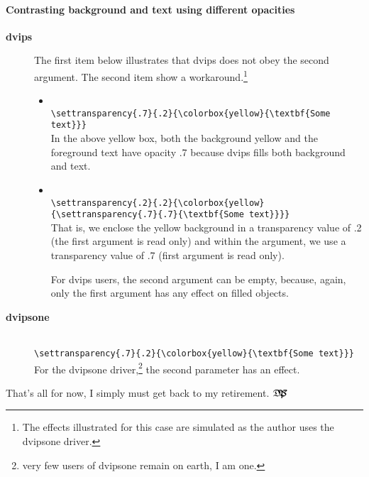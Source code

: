 \documentclass{article}
\let\app\textsf
\def\dps{$\hbox{$\mathfrak D$\kern-.3em\hbox{$\mathfrak P$}%
   \kern-.6em \hbox{$\mathcal S$}}$}
\begin{document}
\paragraph*{Contrasting background and text using different opacities}\leavevmode
\begin{description}
\item[\bfseries\textsf{dvips}] The first item below illustrates that \textsf{dvips} does not obey
the second argument. The second item show a workaround.\footnote{The effects illustrated for this
case are simulated as the author uses the \textsf{dvipsone} driver.}
  \begin{itemize}
    \item {}\\[3pt]
        {\small\verb~\settransparency{.7}{.2}{\colorbox{yellow}{\textbf{Some text}}}~}\\[3pt]
        In the above yellow box, both the background yellow and the
        foreground text have opacity .7 because \app{dvips} fills both
        background and text.
    \item {}\\[3pt]
        {\small\verb~\settransparency{.2}{.2}{\colorbox{yellow}~\\
        \null\qquad\verb~{\settransparency{.7}{.7}{\textbf{Some text}}}}~}\\[3pt]
        That is, we enclose the yellow background in a transparency value of .2 (the first argument is read only)
        and within the  argument, we use a transparency value of .7 (first argument is read only).

        For \app{dvips} users, the second argument can be empty, because, again, only the first argument has
        any effect on filled objects.
  \end{itemize}
\item[\bfseries\textsf{dvipsone}] \\[3pt]
        {\small\verb~\settransparency{.7}{.2}{\colorbox{yellow}{\textbf{Some text}}}~}\\[3pt]
       For the \textsf{dvipsone} driver,\footnote{very few users of
       \textsf{dvipsone} remain on earth, I am one.} the second parameter
       has an effect.
\end{description}

\newtopic\noindent
That's all for now, I simply must get back to my retirement. \dps
\end{document}
